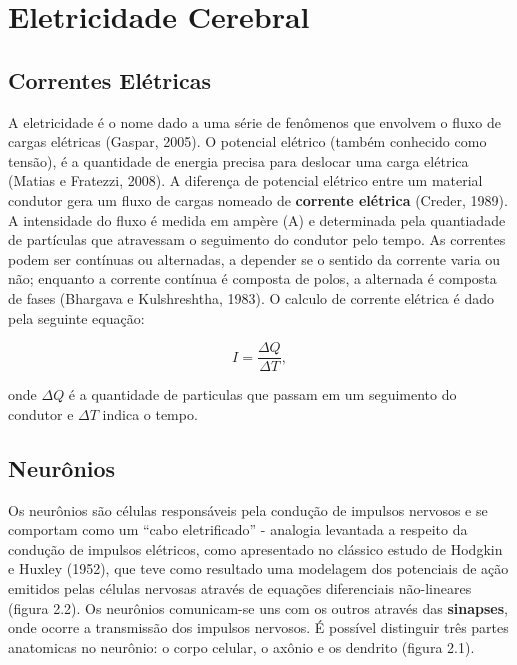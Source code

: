 \chapter{Eletricidade Cerebral}



\section{Correntes Elétricas}
A eletricidade é o nome dado a uma série de fenômenos que envolvem o fluxo de cargas elétricas (Gaspar, 2005). 
O potencial elétrico (também conhecido como tensão), é a quantidade de energia precisa para deslocar uma carga elétrica (Matias e Fratezzi, 2008). 
A diferença de potencial elétrico entre um material condutor gera um fluxo de 
cargas nomeado de \textbf{corrente elétrica} (Creder, 1989).
A intensidade do fluxo é medida em ampère (A) e determinada pela quantiadade de partículas que atravessam o seguimento
do condutor pelo tempo. As correntes podem ser contínuas ou alternadas, a depender se o sentido da corrente varia ou não; enquanto a corrente contínua 
é composta de polos, a alternada é composta de fases (Bhargava e Kulshreshtha, 1983). O calculo de corrente elétrica é 
dado pela seguinte equação:

\begin{equation}
    I = \frac{\Delta Q }{\Delta T},
\end{equation}

onde $\Delta Q$ é a quantidade de particulas que passam em um seguimento do condutor e $\Delta T$ indica o tempo. 

\section{Neurônios}
Os neurônios são células responsáveis pela condução de impulsos nervosos e se comportam como um “cabo eletrificado” - analogia
levantada a respeito da condução de impulsos elétricos, como apresentado no clássico estudo de Hodgkin e Huxley (1952), 
que teve como resultado uma modelagem dos potenciais de ação emitidos pelas células 
nervosas através de equações diferenciais não-lineares (figura 2.2). 
Os neurônios comunicam-se uns com os outros através das \textbf{sinapses}, onde ocorre a transmissão dos impulsos nervosos. 
É possível distinguir três partes anatomicas no neurônio: o corpo celular, o axônio e os dendrito (figura 2.1). 

